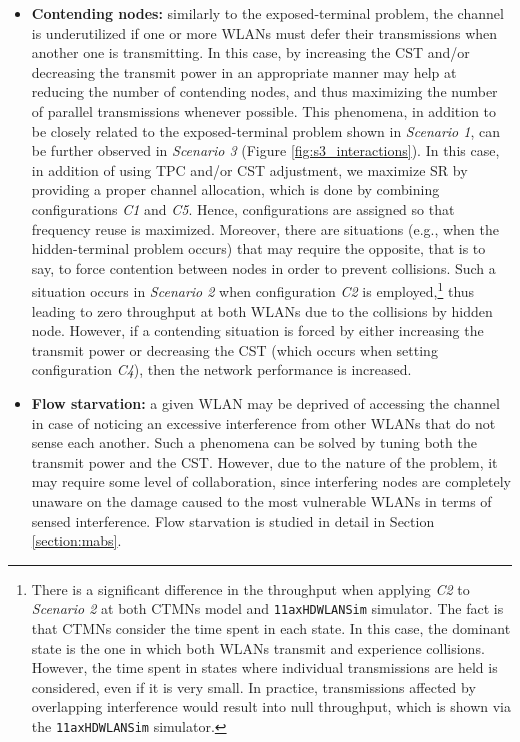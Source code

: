 \documentclass[preprint,12pt]{elsarticle}
\begin{document}
\begin{itemize}
	\item \textbf{Contending nodes:} similarly to the exposed-terminal problem, the channel is underutilized if one or more WLANs must defer their transmissions when another one is transmitting. In this case, by increasing the CST and/or decreasing the transmit power in an appropriate manner may help at reducing the number of contending nodes, and thus maximizing the number of parallel transmissions whenever possible. This phenomena, in addition to be closely related to the exposed-terminal problem shown in \emph{Scenario 1}, can be further observed in \emph{Scenario 3} (Figure \ref{fig:s3_interactions}). In this case, in addition of using TPC and/or CST adjustment, we maximize SR by providing a proper channel allocation, which is done by combining configurations \emph{C1} and \emph{C5}. Hence, configurations are assigned so that frequency reuse is maximized. Moreover, there are situations (e.g., when the hidden-terminal problem occurs) that may require the opposite, that is to say, to force contention between nodes in order to prevent collisions. Such a situation occurs in \emph{Scenario 2} when configuration \emph{C2} is employed,\footnote{There is a significant difference in the throughput when applying \emph{C2} to \emph{Scenario 2} at both CTMNs model and \texttt{11axHDWLANSim} simulator. The fact is that CTMNs consider the time spent in each state. In this case, the dominant state is the one in which both WLANs transmit and experience collisions. However, the time spent in states where individual transmissions are held is considered, even if it is very small. In practice, transmissions affected by overlapping interference would result into null throughput, which is shown via the \texttt{11axHDWLANSim} simulator.} thus leading to zero throughput at both WLANs due to the collisions by hidden node. However, if a contending situation is forced by either increasing the transmit power or decreasing the CST (which occurs when setting configuration \emph{C4}), then the network performance is increased. 		
	\item \textbf{Flow starvation:} a given WLAN may be deprived of accessing the channel in case of noticing an excessive interference from other WLANs that do not sense each another. Such a phenomena can be solved by tuning both the transmit power and the CST. However, due to the nature of the problem, it may require some level of collaboration, since interfering nodes are completely unaware on the damage caused to the most vulnerable WLANs in terms of sensed interference. Flow starvation is studied in detail in Section \ref{section:mabs}.

\end{itemize}
\end{document}
